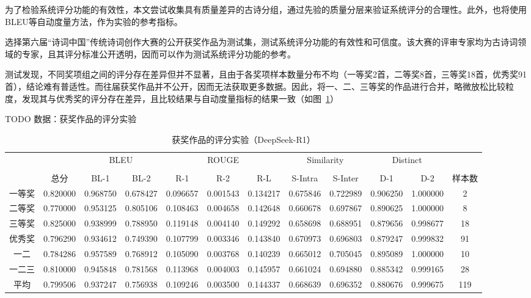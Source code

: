为了检验系统评分功能的有效性，本文尝试收集具有质量差异的古诗分组，通过先验的质量分层来验证系统评分的合理性。此外，也将使用BLEU等自动度量方法，作为实验的参考指标。

选择第六届“诗词中国”传统诗词创作大赛的公开获奖作品为测试集，测试系统评分功能的有效性和可信度。该大赛的评审专家均为古诗词领域的专家，且其评分标准公开透明，因而可以作为测试系统评分功能的参考。

测试发现，不同奖项组之间的评分存在差异但并不显著，且由于各奖项样本数量分布不均（一等奖2首，二等奖8首，三等奖18首，优秀奖91首），结论难有普适性。而往届获奖作品并不公开，因而无法获取更多数据。因此，将一、二、三等奖的作品进行合并，略微放松比较粒度，发现其与优秀奖的评分存在差异，且比较结果与自动度量指标的结果一致（如图~\ref{tab:test_scoring_pprized_dsr1}）

TODO 数据：获奖作品的评分实验

\begin{table}[ht]
  \centering
  \caption{获奖作品的评分实验（DeepSeek-R1）}
  \label{tab:test_scoring_pprized_dsr1}
  \begin{tabularx}{\textwidth}{cccccccccccc}
      \toprule
      &  & \multicolumn{2}{c}{BLEU} & \multicolumn{3}{c}{ROUGE} & \multicolumn{2}{c}{Similarity} & \multicolumn{2}{c}{Distinct}& \\
      \cmidrule(r){3-4} \cmidrule(l){5-7} \cmidrule(l){8-9} \cmidrule(l){10-11}\\
      &	总分 & BL-1& BL-2& R-1& R-2& R-L& S-Intra& S-Inter& D-1& D-2& 样本数\\
      \midrule
      一等奖&	0.820000 	&	0.968750 	&	0.678427 	&	0.096657 	&	0.001543 	&	0.134217 	&	0.675846 	&	0.722989 	&	0.906250 	&	1.000000 	&	2	\\
      二等奖&	0.770000 	&	0.953125 	&	0.805106 	&	0.108463 	&	0.004658 	&	0.142648 	&	0.660678 	&	0.697867 	&	0.890625 	&	1.000000 	&	8	\\
      三等奖&	0.825000 	&	0.938999 	&	0.788950 	&	0.119148 	&	0.004140 	&	0.149292 	&	0.658698 	&	0.688951 	&	0.879656 	&	0.998677 	&	18	\\
      优秀奖&	0.796290 	&	0.934612 	&	0.749390 	&	0.107799 	&	0.003346 	&	0.143840 	&	0.670973 	&	0.696803 	&	0.879247 	&	0.999832 	&	91	\\
      
      \cmidrule{2-11} %
      一二&	0.784286 	&	0.957589 	&	0.768912 	&	0.105090 	&	0.003768 	&	0.140239 	&	0.665012 	&	0.705045 	&	0.895089 	&	1.000000 	&	10	\\
      一二三&	0.810000 	&	0.945848 	&	0.781568 	&	0.113968 	&	0.004003 	&	0.145957 	&	0.661024 	&	0.694880 	&	0.885342 	&	0.999165 	&	28	\\
      
      \cmidrule{2-11} %
      平均&	0.799506 	&	0.937247 	&	0.756938 	&	0.109246 	&	0.003500 	&	0.144337 	&	0.668639 	&	0.696352 	&	0.880676 	&	0.999675 	&	119	\\

      \bottomrule
  \end{tabularx}
\end{table}


